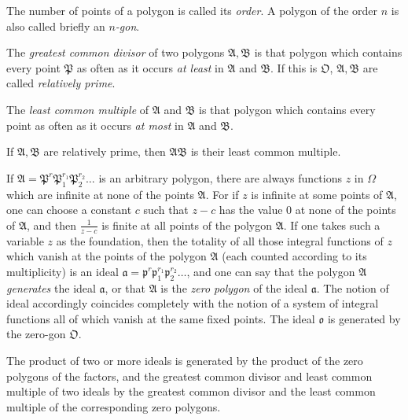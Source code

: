 \documentclass{article}
\begin{document}
The number of points of a polygon is called its \emph{order}. A polygon of the order $n$ is also called briefly an \emph{$n$-gon}.

The \emph{greatest common divisor} of two polygons $\mathfrak{A}, \mathfrak{B}$ is that polygon which contains every point $\mathfrak{P}$ as often as it occurs \emph{at least} in $\mathfrak{A}$ and $\mathfrak{B}$. If this is $\mathfrak{O}$, $\mathfrak{A}, \mathfrak{B}$ are called \emph{relatively prime}.

The \emph{least common multiple} of $\mathfrak{A}$ and $\mathfrak{B}$ is that polygon which contains every point as often as it occurs \emph{at most} in $\mathfrak{A}$ and $\mathfrak{B}$.

If $\mathfrak{A}, \mathfrak{B}$ are relatively prime, then $\mathfrak{A}\mathfrak{B}$ is their least common multiple.

If $\mathfrak{A} = \mathfrak{P}^{r}\mathfrak{P}_{1}^{r_{1}}\mathfrak{P}_{2}^{r_{2}}\ldots$ is an arbitrary polygon, there are always functions $z$ in $\Omega$ which are infinite at none of the points $\mathfrak{A}$. For if $z$ is infinite at some points of $\mathfrak{A}$, one can choose a constant $c$ such that $z-c$ has the value 0 at none of the points of $\mathfrak{A}$, and then $\frac{1}{z-c}$ is finite at all points of the polygon $\mathfrak{A}$. If one takes such a variable $z$ as the foundation, then the totality of all those integral functions of $z$ which vanish at the points of the polygon $\mathfrak{A}$ (each counted according to its multiplicity) is an ideal $\mathfrak{a} = \mathfrak{p}^{r}\mathfrak{p}_{1}^{r_{1}}\mathfrak{p}_{2}^{r_{2}}\ldots$, and one can say that the polygon $\mathfrak{A}$ \emph{generates} the ideal $\mathfrak{a}$, or that $\mathfrak{A}$ is the \emph{zero polygon} of the ideal $\mathfrak{a}$. The notion of ideal accordingly coincides completely with the notion of a system of integral functions all of which vanish at the same fixed points. The ideal $\mathfrak{o}$ is generated by the zero-gon $\mathfrak{O}$.

The product of two or more ideals is generated by the product of the zero polygons of the factors, and the greatest common divisor and least common multiple of two ideals by the greatest common divisor and the least common multiple of the corresponding zero polygons.
\end{document}
